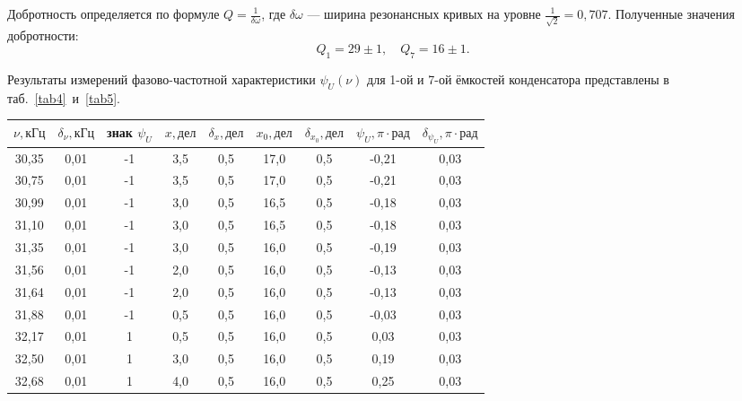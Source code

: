 \documentclass[a4paper, 12pt]{article}
\begin{document}
Добротность определяется по формуле $Q = \frac{1}{\delta \omega}$, где $\delta \omega$ --- ширина резонансных кривых на уровне $\frac{1}{\sqrt{2}} = 0,707$. Полученные значения добротности:
$$ Q_1 = 29\pm1, \quad Q_7 = 16\pm1.$$

\newpage

Результаты измерений фазово-частотной характеристики $\psi_U(\nu)$ для 1-ой и 7-ой ёмкостей конденсатора представлены в таб.~\ref{tab4}~и~\ref{tab5}.

\begin{table}[h!]
\begin{center}
\begin{tabular}{|c|c|c|c|c|c|c|c|c|}
\hline
$\nu, кГц$ & $\delta_{\nu}, кГц$ & знак $\psi_U$ & $x, дел$ & $\delta_x, дел$ & $x_0, дел$ & $\delta_{x_0}, дел$ & $\psi_U, \pi \cdot рад$ & $\delta_{\psi_U}, \pi \cdot рад$ \\ \hline
30,35  & 0,01    & -1         & 3,5    & 0,5     & 17,0    & 0,5      & -0,21        & 0,03           \\ \hline
30,75  & 0,01    & -1         & 3,5    & 0,5     & 17,0    & 0,5      & -0,21        & 0,03           \\ \hline
30,99  & 0,01    & -1         & 3,0    & 0,5     & 16,5    & 0,5      & -0,18        & 0,03           \\ \hline
31,10  & 0,01    & -1         & 3,0    & 0,5     & 16,5    & 0,5      & -0,18        & 0,03           \\ \hline
31,35  & 0,01    & -1         & 3,0    & 0,5     & 16,0    & 0,5      & -0,19        & 0,03           \\ \hline
31,56  & 0,01    & -1         & 2,0    & 0,5     & 16,0    & 0,5      & -0,13        & 0,03           \\ \hline
31,64  & 0,01    & -1         & 2,0    & 0,5     & 16,0    & 0,5      & -0,13        & 0,03           \\ \hline
31,88  & 0,01    & -1         & 0,5    & 0,5     & 16,0    & 0,5      & -0,03        & 0,03           \\ \hline
32,17  & 0,01    & 1          & 0,5    & 0,5     & 16,0    & 0,5      & 0,03         & 0,03            \\ \hline
32,50  & 0,01    & 1          & 3,0    & 0,5     & 16,0    & 0,5      & 0,19         & 0,03            \\ \hline
32,68  & 0,01    & 1          & 4,0    & 0,5     & 16,0    & 0,5      & 0,25         & 0,03            \\ \hline

\end{tabular}
\end{center}
\end{table}
\end{document}
